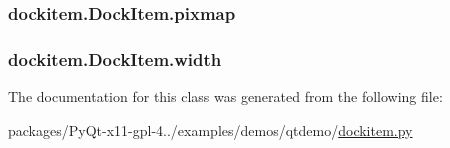 \subsubsection[{pixmap}]{\setlength{\rightskip}{0pt plus 5cm}dockitem.\+Dock\+Item.\+pixmap}\label{classdockitem_1_1DockItem_a437a08fb6f8c3a2266f3242fad8c6fd5}
\hypertarget{classdockitem_1_1DockItem_afad6a12ebe9540a16acad41cbea79ca8}{}
\subsubsection[{width}]{\setlength{\rightskip}{0pt plus 5cm}dockitem.\+Dock\+Item.\+width}\label{classdockitem_1_1DockItem_afad6a12ebe9540a16acad41cbea79ca8}


The documentation for this class was generated from the following file\+:\begin{DoxyCompactItemize}
\item 
packages/\+Py\+Qt-\/x11-\/gpl-\/4../examples/demos/qtdemo/\hyperlink{dockitem_8py}{dockitem.\+py}\end{DoxyCompactItemize}
